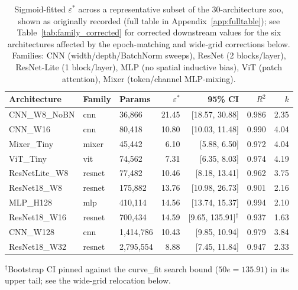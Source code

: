 \documentclass[11pt]{article}
\newcommand{\eps}{\varepsilon}
\newcommand{\epsstar}{\eps^{*}}
\begin{document}
\begin{table}[h]
\centering
\caption{Sigmoid-fitted $\epsstar$ across a representative subset of the
30-architecture zoo, shown as originally recorded (full table in
Appendix~\ref{app:fulltable}); see Table~\ref{tab:family_corrected} for
corrected downstream values for the six architectures affected by the
epoch-matching and wide-grid corrections below. Families: CNN
(width/depth/BatchNorm sweeps), ResNet (2 blocks/layer), ResNet-Lite (1
block/layer), MLP (no spatial inductive bias), ViT (patch attention),
Mixer (token/channel MLP-mixing).}
\label{tab:crossover}
\small
\begin{tabular}{lllrrrr}
\toprule
Architecture & Family & Params & $\epsstar$ & 95\% CI & $R^2$ & $k$ \\
\midrule
CNN\_W8\_NoBN     & cnn    & 36,866    & 21.45 & [18.57, 30.88]  & 0.986 & 2.35 \\
CNN\_W16          & cnn    & 80,418    & 10.80 & [10.03, 11.48]  & 0.990 & 4.04 \\
Mixer\_Tiny       & mixer  & 45,442    & 6.10  & [5.88, 6.50]    & 0.972 & 4.04 \\
ViT\_Tiny         & vit    & 74,562    & 7.31  & [6.35, 8.03]    & 0.974 & 4.19 \\
ResNetLite\_W8    & resnet & 77,482    & 10.46 & [8.18, 13.41]   & 0.962 & 3.75 \\
ResNet18\_W8      & resnet & 175,882   & 13.76 & [10.98, 26.73]  & 0.901 & 2.16 \\
MLP\_H128         & mlp    & 410,114   & 14.56 & [13.74, 15.37]  & 0.994 & 2.10 \\
ResNet18\_W16     & resnet & 700,434   & 14.59 & [9.65, 135.91]$^\dagger$ & 0.937 & 1.63 \\
CNN\_W128         & cnn    & 1,414,786 & 10.43 & [9.85, 10.94]   & 0.979 & 3.84 \\
ResNet18\_W32     & resnet & 2,795,554 & 8.88  & [7.45, 11.84]   & 0.947 & 2.33 \\
\bottomrule
\end{tabular}

\raggedright\footnotesize$^\dagger$Bootstrap CI pinned against the
curve\_fit search bound ($50e=135.91$) in its upper tail; see the
wide-grid relocation below.
\end{table}
\end{document}
